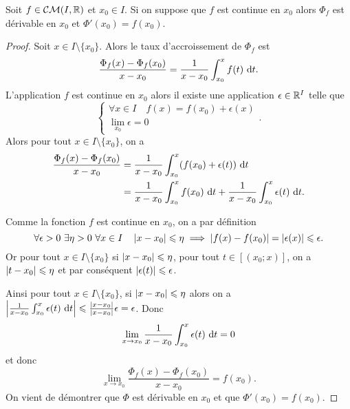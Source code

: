 \begin{prop}
  Soit \(f \in \mathcal{CM}(I,\mathbb{R})\) et \(x_0 \in I\). Si on suppose que \(f\) est 
  continue en \(x_0\) alors \(\Phi_f\) est dérivable en \(x_0\) et 
  \(\Phi'(x_0) = f(x_0)\).
\end{prop}
\begin{proof}
  Soit \(x \in I \setminus\{x_0\}\). Alors le taux d'accroissement de \(\Phi_f\) 
  est
  \begin{equation}
    \frac{\Phi_f(x)-\Phi_f(x_0)}{x-x_0} = \frac{1}{x-x_0} \int_{x_0}^x 
    f(t)\,\mathop{}\mathopen{}\mathrm{d} t.
  \end{equation}
  L'application \(f\) est continue en \(x_0\) alors il existe une application 
  \(\epsilon \in \mathbb{R}^I\) telle que
  \begin{equation}
    \begin{cases} \forall x \in I \quad f(x) = f(x_0)+\epsilon(x) \\ 
    \lim\limits_{x_0} \epsilon =0 \end{cases}.
  \end{equation}
  Alors pour tout \(x \in I \setminus\{x_0\}\), on a
  \begin{align*}
    \frac{\Phi_f(x)-\Phi_f(x_0)}{x-x_0} &= \frac{1}{x-x_0} \int_{x_0}^x 
    (f(x_0)+\epsilon(t))\,\mathop{}\mathopen{}\mathrm{d} t \\
    &=  \frac{1}{x-x_0} \int_{x_0}^x f(x_0)\,\mathop{}\mathopen{}\mathrm{d} t + \frac{1}{x-x_0} 
    \int_{x_0}^x\epsilon(t)\,\mathop{}\mathopen{}\mathrm{d} t.
  \end{align*}

  Comme la fonction \(f\) est continue en \(x_0\), on a par définition
  \begin{equation}
    \forall \epsilon >0 \ \exists \eta>0 \ \forall x \in I \quad \left\lvert x-x_0\right\rvert 
    \leqslant \eta \implies \left\lvert f(x)-f(x_0)\right\rvert = \left\lvert\epsilon(x)\right\rvert \leqslant 
    \epsilon.
  \end{equation}
  Or pour tout \(x \in I \setminus\{x_0\}\) si \(\left\lvert x-x_0\right\rvert\leqslant \eta\), 
  pour tout \(t \in [(x_0;x)]\), on a \(\left\lvert t-x_0\right\rvert \leqslant \eta\) et par 
  conséquent \(\left\lvert\epsilon(t)\right\rvert\leqslant \epsilon\).

  Ainsi pour tout \(x \in I \setminus\{x_0\}\), si \(\left\lvert x-x_0\right\rvert\leqslant \eta\) 
  alors on a \(\left\lvert\frac{1}{x-x_0} \int_{x_0}^x\epsilon(t)\,\mathop{}\mathopen{}\mathrm{d} t\right\rvert \leqslant 
  \frac{\left\lvert x-x_0\right\rvert}{\left\lvert x-x_0\right\rvert}\epsilon = \epsilon\). Donc
  \begin{equation}
    \lim\limits_{x \to x_0} \frac{1}{x-x_0} \int_{x_0}^x\epsilon(t)\,\mathop{}\mathopen{}\mathrm{d} t = 0
  \end{equation}
  et donc
  \begin{equation}
    \lim\limits_{x \to x_0}\frac{\Phi_f(x)-\Phi_f(x_0)}{x-x_0} =f(x_0).
  \end{equation}
  On vient de démontrer que \(\Phi\) est dérivable en \(x_0\) et que 
  \(\Phi'(x_0) = f(x_0)\).
\end{proof}

